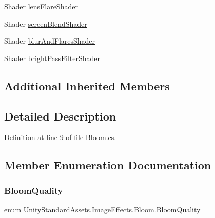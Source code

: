 \begin{DoxyCompactItemize}
\item 
Shader \mbox{\hyperlink{class_unity_standard_assets_1_1_image_effects_1_1_bloom_ac4b52d2e618f61a545aa0ccf7610b0d1}{lens\+Flare\+Shader}}
\item 
Shader \mbox{\hyperlink{class_unity_standard_assets_1_1_image_effects_1_1_bloom_af8a1f08493839c99fbfeb0110b54f6f5}{screen\+Blend\+Shader}}
\item 
Shader \mbox{\hyperlink{class_unity_standard_assets_1_1_image_effects_1_1_bloom_a9b5496f4e7fdf06fd188341758dbd47b}{blur\+And\+Flares\+Shader}}
\item 
Shader \mbox{\hyperlink{class_unity_standard_assets_1_1_image_effects_1_1_bloom_a686baeb3603571e21ee795413da4cdcb}{bright\+Pass\+Filter\+Shader}}
\end{DoxyCompactItemize}
\subsection*{Additional Inherited Members}


\subsection{Detailed Description}


Definition at line 9 of file Bloom.\+cs.



\subsection{Member Enumeration Documentation}
\mbox{\label{class_unity_standard_assets_1_1_image_effects_1_1_bloom_a38ac8039f8a9f5246ce838730d19efcc}} 
\subsubsection{\texorpdfstring{Bloom\+Quality}{BloomQuality}}
{\footnotesize\ttfamily enum \mbox{\hyperlink{class_unity_standard_assets_1_1_image_effects_1_1_bloom_a38ac8039f8a9f5246ce838730d19efcc}{Unity\+Standard\+Assets.\+Image\+Effects.\+Bloom.\+Bloom\+Quality}}\hspace{0.3cm}{\ttfamily [strong]}}

